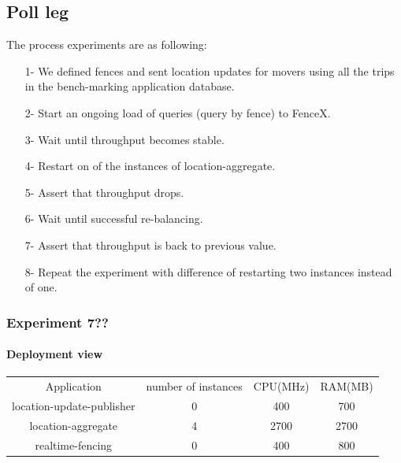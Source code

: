 \documentclass[a4]{report}
\begin{document}
    \subsection{Poll leg}
    The process experiments are as following:
    \begin{itemize}
        \item[1-] We defined fences and sent location updates for movers using all the trips in the bench-marking
        application database.
        \item[2-] Start an ongoing load of queries (query by fence) to FenceX.
        \item[3-] Wait until throughput becomes stable.
        \item[4-] Restart on of the instances of location-aggregate.
        \item[5-] Assert that throughput drops.
        \item[6-] Wait until successful re-balancing.
        \item[7-] Assert that throughput is back to previous value.
        \item[8-] Repeat the experiment with difference of restarting two instances instead of one.
    \end{itemize}

    \subsubsection{Experiment 7??}
    \paragraph{Deployment view}
    \begin{center}
        \begin{tabular}{ c c c c }
            Application               &  number of instances     & CPU(MHz)  & RAM(MB)    \\
            location-update-publisher &          0               & 400       &   700      \\
            location-aggregate        &          4               & 2700      &   2700     \\
            realtime-fencing          &          0               & 400       &   800      \\
        \end{tabular}
    \end{center}
\end{document}
